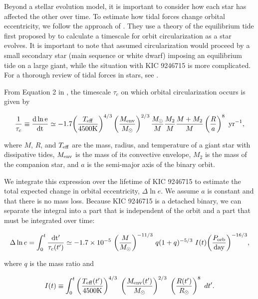 Beyond a stellar evolution model, it is important to consider how each star has affected the other over time. To estimate how tidal forces change orbital eccentricity, we follow the approach of \citet{ver95}. They use a theory of the equilibrium tide first proposed by \citet{zah77} to calculate a timescale for orbit circularization as a star evolves. It is important to note that \citet{ver95} assumed circularization would proceed by a small secondary star (main sequence or white dwarf) imposing an equilibrium tide on a large giant, while the situation with KIC 9246715 is more complicated. For a thorough review of tidal forces in stars, see \citet{ogi14}.

From Equation 2 in \citet{ver95}, the timescale $\tau_c$ on which orbital circularization occurs is given by

\begin{equation}
\frac{1}{\tau_c} \equiv \frac{\rm{d} \ln e}{\rm{d}t} \simeq -1.7 {\left( \frac{T_{\rm{eff}}}{4500 \rm{K}} \right)}^{4/3} \left( \frac{M_{\rm{env}}}{M_{\odot}} \right)^{2/3} \frac{M_{\odot}}{M} \frac{M_2}{M} \frac{M+M_2}{M} \left( \frac{R}{a} \right)^8 \ \rm{yr}^{-1},
\end{equation}

where $M$, $R$, and $T_{\rm{eff}}$ are the mass, radius, and temperature of a giant star with dissipative tides, $M_{\rm{env}}$ is the mass of its convective envelope, $M_2$ is the mass of the companion star, and $a$ is the semi-major axis of the binary orbit.

We integrate this expression over the lifetime of KIC 9246715 to estimate the total expected change in orbital eccentricity, $\Delta \ln e$. We assume $a$ is constant and that there is no mass loss. Because KIC 9246715 is a detached binary, we can separate the integral into a part that is independent of the orbit and a part that must be integrated over time:

\begin{equation}\label{tide1}
\Delta \ln e = \int_0^t \frac{\rm{d}t'}{\tau_c(t')} \simeq -1.7 \times 10^{-5} \ {\left( \frac{M}{M_{\odot}} \right)}^{-11/3} \ q(1+q)^{-5/3} \ I(t) {\left( \frac{P_{\rm{orb}}}{\rm{day}} \right)}^{-16/3},
\end{equation}

where $q$ is the mass ratio and

\begin{equation}
I(t) \equiv \int_0^t \left( \frac{T_{\rm{eff}}(t')}{4500 \rm{K}} \right)^{4/3} \ \left( \frac{M_{\rm{env}}(t')}{M_{\odot}} \right)^{2/3} \ \left( \frac{R(t')}{R_{\odot}} \right)^8 \ dt'.
\end{equation}

